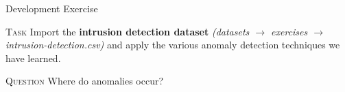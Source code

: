 \documentclass[document.tex]{subfiles}
\begin{document}
    \begin{frame}{Development Exercise }
        \begin{alertblock}{\textsc{Task}}
            Import the \textbf{intrusion detection dataset} \textit{(datasets $\rightarrow$ exercises $\rightarrow$ intrusion-detection.csv)} and apply the various anomaly detection techniques we have learned.
        \end{alertblock}
        \begin{alertblock}{\textsc{Question}}
            Where do anomalies occur?
        \end{alertblock}
    \end{frame}
\end{document}
